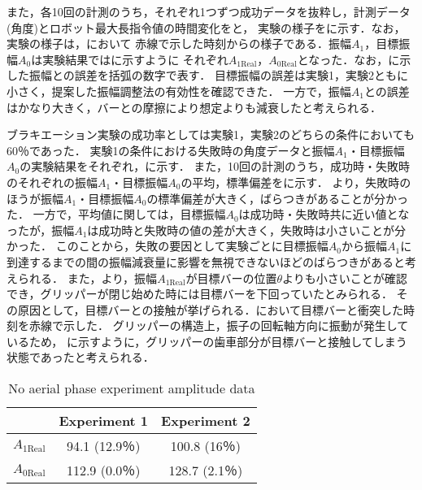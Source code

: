         また，各10回の計測のうち，それぞれ1つずつ成功データを抜粋し，計測データ(角度)とロボット最大長指令値の時間変化をと，
        実験の様子をに示す．なお，実験の様子は，において
        赤線で示した時刻からの様子である．振幅$A_1$，目標振幅$A_0$は実験結果ではに示すように
        それぞれ$A_{\mathrm{1Real}}$，$A_{\mathrm{0Real}}$となった．なお，に示した振幅との誤差を括弧の数字で表す．
        目標振幅の誤差は実験1，実験2ともに小さく，提案した振幅調整法の有効性を確認できた．
        一方で，振幅$A_1$との誤差はかなり大きく，バーとの摩擦により想定よりも減衰したと考えられる．
        
        ブラキエーション実験の成功率としては実験1，実験2のどちらの条件においても60％であった．
        実験1の条件における失敗時の角度データと振幅$A_1$・目標振幅$A_0$の実験結果をそれぞれ，に示す．
        また，10回の計測のうち，成功時・失敗時のそれぞれの振幅$A_1$・目標振幅$A_0$の平均，標準偏差をに示す．
        より，失敗時のほうが振幅$A_1$・目標振幅$A_0$の標準偏差が大きく，ばらつきがあることが分かった．
        一方で，平均値に関しては，目標振幅$A_0$は成功時・失敗時共に近い値となったが，振幅$A_1$は成功時と失敗時の値の差が大きく，失敗時は小さいことが分かった．
        このことから，失敗の要因として実験ごとに目標振幅$A_0$から振幅$A_1$に到達するまでの間の振幅減衰量に影響を無視できないほどのばらつきがあると考えられる．
        また，より，振幅$A_{\mathrm{1Real}}$が目標バーの位置$\theta$よりも小さいことが確認でき，グリッパーが閉じ始めた時には目標バーを下回っていたとみられる．
        その原因として，目標バーとの接触が挙げられる．において目標バーと衝突した時刻を赤線で示した．
        グリッパーの構造上，振子の回転軸方向に振動が発生しているため，
        に示すように，グリッパーの歯車部分が目標バーと接触してしまう状態であったと考えられる．
        \begin{table}[bh]
                \begin{center}
                  \caption{No aerial phase experiment amplitude data}
                  \vspace{2mm}
                  \begin{tabular}{c|cc}
                    \hline
                     & Experiment 1 & Experiment 2\\
                    \hline
                    $A_{\mathrm{1Real}}$ & 94.1 (12.9％)& 100.8 (16％)\\
                    $A_{\mathrm{0Real}}$ & 112.9 (0.0％)& 128.7 (2.1％)\\                      
                    \hline
                  \end{tabular}
                \end{center}
              \end{table}
